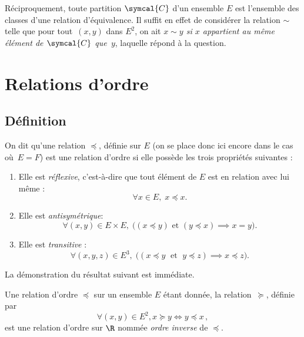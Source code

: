 \begin{remark}
Réciproquement, toute partition $\symcal{C}$ d'un ensemble $E$ est l'ensemble des classes d'une relation d'équivalence. Il suffit en effet de considérer la relation $\sim$ telle que pour tout~$(x,y)$ dans $E^2$, on ait \textit{$x\sim y$ si $x$  appartient au même élément de $\symcal{C}$ que~$y$}, laquelle répond à la question.
\end{remark}
%

\section{Relations d'ordre}
\subsection{Définition}
On dit qu'une relation $\preccurlyeq$, définie sur $E$ (on se place donc ici encore dans le cas où~$E=F$) est une relation d'ordre si elle possède les trois propriétés suivantes :
\begin{enumerate}
\item Elle est \emph{réflexive}, c'est-à-dire que tout élément de $E$ est en relation avec lui même :
\[\forall x \in E,\; x\preccurlyeq x.\]
\item Elle est \emph{antisymétrique}:
\[\forall (x,y)\in E\times E,\; \bigl((x\preccurlyeq y)\text{ et }(y\preccurlyeq x)\implies x=y\bigr).\]
\item Elle est \emph{transitive} :
\[
\forall (x,y,z)\in E^3,\; \bigl((x\preccurlyeq y\;\text{ et }\;y\preccurlyeq z)\implies x\preccurlyeq z\bigr).
\]
\end{enumerate}

\begin{remark}
La démonstration du résultat suivant est immédiate.

Une relation d'ordre $\preccurlyeq$ sur un ensemble $E$ étant donnée, la relation~$\succcurlyeq$, définie par 
\[\forall (x,y) \in E^2, x\succcurlyeq y \iff y\preccurlyeq x\,,\] 
est une relation d'ordre sur $\R$ nommée \emph{ordre inverse} de $\preccurlyeq$.
\end{remark}

